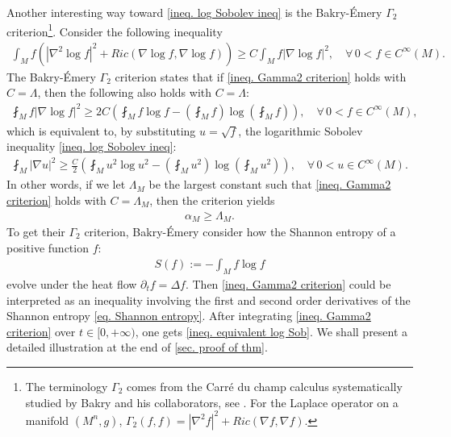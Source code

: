 \documentclass[11pt]{amsart}
\numberwithin{equation}{section}
\numberwithin{lemma}{section}
\numberwithin{proposition}{section}
\numberwithin{corollary}{section}
\numberwithin{remark}{section}
\begin{document}
    Another interesting way toward \cref{ineq. log Sobolev ineq} is the  Bakry-\'{E}mery $\Gamma_2$ criterion\footnote{The terminology $\Gamma_2$ comes from the Carr\'e du champ calculus systematically studied by Bakry and his collaborators, see \cite{Led00}. For the Laplace operator on a manifold $(M^n,g)$, $\Gamma_2(f,f)=|\nabla^2 f|^2+Ric(\nabla f,\nabla f)$.}. 
    Consider the  following inequality
    \begin{align}\label{ineq. Gamma2 criterion}
        \int_M f(|\nabla^2\log f|^2+Ric(\nabla \log f,\nabla \log f))
        \geq 
        C\int_M f|\nabla \log f|^2,\quad 
        \forall\, 0<f\in C^{\infty}(M).
    \end{align}
    The Bakry-\'{E}mery $\Gamma_2$ criterion \cite{BE06} states that if \cref{ineq. Gamma2 criterion} holds with $C=\Lambda$, then the following also holds with $C=\Lambda$:
    \begin{align}\label{ineq. equivalent log Sob}
        \fint_M f|\nabla\log f|^2
        \geq 
        2C\left(
        \fint_M f\log f
        -\left(\fint_M f\right)
        \log\left(\fint_M f\right)
        \right),\quad 
        \forall \, 0<f\in C^{\infty}(M),
    \end{align}
     which    
    is equivalent to, by substituting $u=\sqrt{f}$, the logarithmic Sobolev inequality \cref{ineq. log Sobolev ineq}:
    \begin{align*}
        \fint_M |\nabla u|^2\geq
        \frac{C}{2}\left(
        \fint_M u^2\log u^2
        -\left(\fint_M u^2\right)
        \log\left(\fint_M u^2\right)
        \right),\quad \forall\, 0<u\in C^{\infty}(M).
    \end{align*}
    In other words, if we let $\Lambda_M$ be the largest constant such that \cref{ineq. Gamma2 criterion} holds with $C=\Lambda_M$, then the criterion yields
    \begin{align}\label{ineq. Bakry Emery criterion}
        \alpha_M\geq \Lambda_M.
    \end{align}
    To get their $\Gamma_2$ criterion, Bakry-\'Emery consider how the Shannon entropy of a positive function $f$:
    \begin{align}\label{eq. Shannon entropy}
        S(f):=-\int_Mf\log f
    \end{align}
    evolve under the heat flow $\partial_t f=\Delta f$. Then 
    \cref{ineq. Gamma2 criterion} could be interpreted as an inequality involving the first and second order derivatives of the Shannon entropy \cref{eq. Shannon entropy}. 
    After integrating \cref{ineq. Gamma2 criterion} over $t\in[0,+\infty)$, one gets \cref{ineq. equivalent log Sob}.  We shall present a  detailed illustration at the end of \cref{sec. proof of thm}.
    
\end{document}
